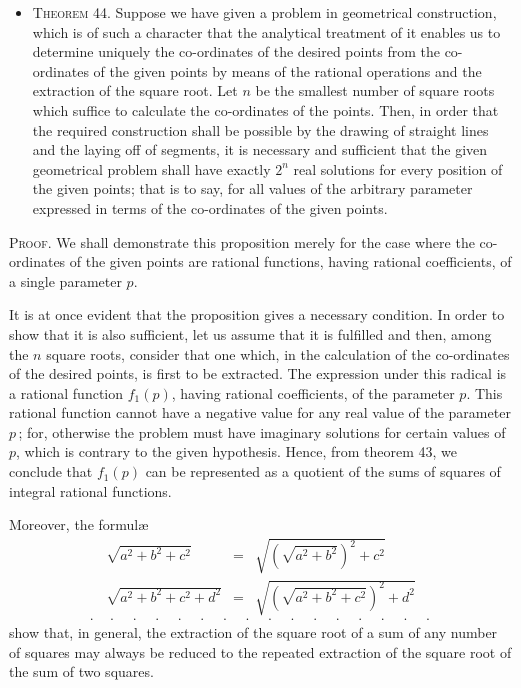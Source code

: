 \documentclass[11pt,oneside]{book}
\begin{document}
\begin{itemize}
\item[]{\scshape Theorem 44.} Suppose we have given a problem
in geometrical construction, which is of such a
character that the analytical treatment of it
enables us to determine uniquely the co-ordinates
of the desired points from the co-ordinates
of the given points by means of the rational
operations and the extraction of the square root.
Let $n$ be the smallest number of square roots
which suffice to calculate the co-ordinates of
the points. Then, in order that the required
construction shall be possible by the drawing
of straight lines and the laying off of segments,
it is necessary and sufficient that the given geometrical
problem shall have exactly $2^n$ real solutions
for every position of the given points;
that is to say, for all values of the arbitrary
parameter expressed in terms of the co-ordinates
of the given points.
\end{itemize}

{\scshape Proof}. We shall demonstrate this proposition
merely for the case where the co-ordinates of the
given points are rational functions, having rational
coefficients, of a single parameter $p$.

It is at once evident that the proposition gives a
necessary condition. In order to show that it is also
sufficient, let us assume that it is fulfilled and then,
among the $n$ square roots, consider that one which,
in the calculation of the co-ordinates of the desired
points, is first to be extracted. The expression under
this radical is a rational function $f_1(p)$, having rational
coefficients, of the parameter $p$. This rational function
cannot have a negative value for any real value
of the parameter $p$\,; for, otherwise the problem must
have imaginary solutions for certain values of $p$, which
is contrary to the given hypothesis. Hence, from
theorem 43, we conclude that $f_1(p)$ can be represented
as a quotient of the sums of squares of integral rational
functions.

Moreover, the formul{\ae}
\begin{eqnarray*}
\sqrt{a^2 + b^2 + c^2} & = & \sqrt{(\sqrt{a^2 + b^2})^2 + c^2}\\
\sqrt{a^2 + b^2 + c^2 + d^2} & = & \sqrt{(\sqrt{a^2 + b^2 + c^2})^2 + d^2}
\end{eqnarray*}
\[
\cdot \quad \cdot \quad \cdot \quad \cdot \quad \cdot \quad \cdot \quad
\cdot \quad \cdot \quad \cdot \quad \cdot \quad \cdot \quad
\cdot \quad \cdot \quad \cdot \quad \cdot \quad \cdot
\]
show that, in general, the extraction of the square root
of a sum of any number of squares may always be reduced
to the repeated extraction of the square root of
the sum of two squares.
\end{document}
